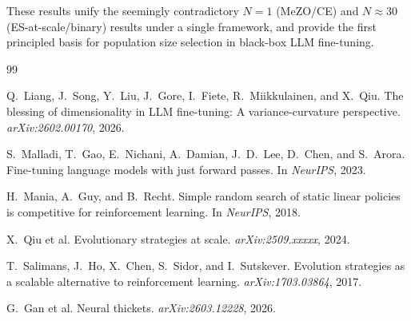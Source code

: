 \documentclass[11pt]{article}
\theoremstyle{definition}
\theoremstyle{remark}
\begin{document}
These results unify the seemingly contradictory $N=1$ (MeZO/CE) and $N \approx 30$ (ES-at-scale/binary) results under a single framework, and provide the first principled basis for population size selection in black-box LLM fine-tuning.


\begin{thebibliography}{99}

Q.~Liang, J.~Song, Y.~Liu, J.~Gore, I.~Fiete, R.~Miikkulainen, and X.~Qiu.
\newblock The blessing of dimensionality in {LLM} fine-tuning: A variance-curvature perspective.
\newblock \emph{arXiv:2602.00170}, 2026.

S.~Malladi, T.~Gao, E.~Nichani, A.~Damian, J.~D.~Lee, D.~Chen, and S.~Arora.
\newblock Fine-tuning language models with just forward passes.
\newblock In \emph{NeurIPS}, 2023.

H.~Mania, A.~Guy, and B.~Recht.
\newblock Simple random search of static linear policies is competitive for reinforcement learning.
\newblock In \emph{NeurIPS}, 2018.

X.~Qiu et al.
\newblock Evolutionary strategies at scale.
\newblock \emph{arXiv:2509.xxxxx}, 2024.

T.~Salimans, J.~Ho, X.~Chen, S.~Sidor, and I.~Sutskever.
\newblock Evolution strategies as a scalable alternative to reinforcement learning.
\newblock \emph{arXiv:1703.03864}, 2017.

G.~Gan et al.
\newblock Neural thickets.
\newblock \emph{arXiv:2603.12228}, 2026.

\end{thebibliography}
\end{document}
